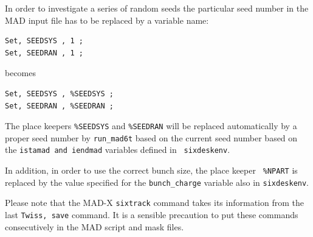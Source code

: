 \documentclass{cernatsnote}
\begin{document}
In order to investigate a series of random seeds the particular seed number in
the MAD input file has to be replaced by a variable name:
\begin{verbatim}
Set, SEEDSYS , 1 ;
Set, SEEDRAN , 1 ;
\end{verbatim}
becomes
\begin{verbatim}
Set, SEEDSYS , %SEEDSYS ;
Set, SEEDRAN , %SEEDRAN ;
\end{verbatim}
The place keepers \texttt{\%SEEDSYS} and \texttt{\%SEEDRAN} will be replaced
automatically by a proper seed number by \texttt{run\_mad6t} based on the current
seed number based on the \texttt{istamad and iendmad} variables defined in {\tt
sixdeskenv}.

In addition, in order to use the correct bunch size, the place keeper {\tt
\%NPART} is replaced by the value specified for the \texttt{bunch\_charge}
variable also in \texttt{sixdeskenv}.

Please note that the MAD-X \texttt{sixtrack} command takes its information from
the last \texttt{Twiss, save} command. It is a sensible precaution to put these
commands consecutively in the MAD script and mask files.
\end{document}
